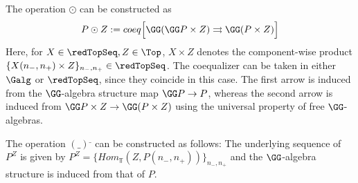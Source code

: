 \documentclass[a4paper,10pt]{amsart}
\begin{document}
The operation $\odot$ can be constructed as 
\[ P \odot Z := coeq \Big[ \GG(\GG P \times Z) \rightrightarrows \GG(P \times Z) \Big] \]
Here, for $X \in \redTopSeq, Z \in \Top$, $X \times Z$ denotes the component-wise product $\{ X(n_-,n_+) \times Z\}_{n_-,n_+} \in \redTopSeq$. The coequalizer can be taken in either $\Galg$ or $\redTopSeq$, since they coincide in this case. The first arrow is induced from the $\GG$-algebra structure map $\GG P \to P$, whereas the second arrow is induced from $\GG P \times Z \to \GG( P \times Z)$ using the universal property of free $\GG$-algebras.

The operation $(\_)^{\_}$ can be constructed as follows: The underlying sequence of $P^Z$ is given by $P^Z=\{Hom_{\Top}(Z,P(n_-,n_+))\}_{n_-,n_+}$ and the $\GG$-algebra structure is induced from that of $P$.\\
\end{document}
